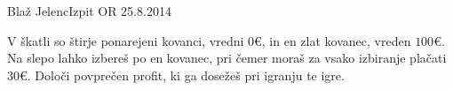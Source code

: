 \begin{naloga}{Blaž Jelenc}{Izpit OR 25.8.2014}
\begin{vprasanje}
V škatli so štirje ponarejeni kovanci, vredni $0 €$,
in en zlat kovanec, vreden $100 €$.
Na slepo lahko izbereš po en kovanec,
pri čemer moraš za vsako izbiranje plačati $30 €$.
Določi povprečen profit, ki ga dosežeš pri igranju te igre.
\end{vprasanje}
\begin{odgovor}
\end{odgovor}
\end{naloga}
